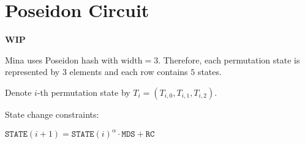 \section{Poseidon Circuit}
\label{section:poseidon}
\textbf{WIP}

Mina uses Poseidon hash with $\text{width} = 3$.
Therefore, each permutation state is represented by $3$ elements and each row contains $5$ states. 


Denote $i$-th permutation state by $T_i = (T_{i, 0}, T_{i, 1}, T_{i, 2})$.

\begin{center}
\begin{table}[H]
\end{table}
\end{center}

State change constraints:
\begin{center}
	$\texttt{STATE}(i+1) = \texttt{STATE}(i)^\alpha \cdot \texttt{MDS} + \texttt{RC}$
\end{center}

